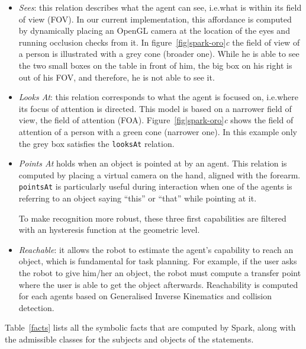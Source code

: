 \documentclass[preprint,3p,times]{elsarticle}
\newcommand{\concept}[1]{{\small \texttt{#1}}}
\newcommand{\ie}{{i.e.\xspace}}
\begin{document}
\begin{itemize}

\item \emph{Sees}: this relation describes what the agent can see, \ie what is
    within its field of view (FOV). In our current implementation, this
    affordance is computed by dynamically placing an OpenGL camera at the
    location of the eyes and running occlusion checks from it.  In
    figure~\ref{fig|spark-oro}\emph{c} the field of view of a person is
    illustrated with a grey cone (broader one). While he is able to see the two
    small boxes on the table in front of him, the big box on his right is out of
    his FOV, and therefore, he is not able to see it. 

\item \emph{Looks At}: this relation corresponds to what the agent is focused
    on, \ie where its focus of attention is directed. This model is based on a
    narrower field of view, the field of attention (FOA).
    Figure~\ref{fig|spark-oro}\emph{c} shows the field of attention
    of a person with a green cone (narrower one). In this example only the grey
    box satisfies the \concept{looksAt} relation.

\item \emph{Points At} holds when an object is pointed at by an agent.
    This relation is computed by placing a virtual camera on the hand, aligned
    with the forearm. \concept{pointsAt} is particularly useful during
    interaction when one of the agents is referring to an object saying ``this''
    or ``that'' while pointing at it.

To make recognition more robust, these three first capabilities are filtered
with an hysteresis function at the geometric level.

\item \emph{Reachable}: it allows the robot to estimate the agent's capability
    to reach an object, which is fundamental for task planning. For example, if
    the user asks the robot to give him/her an object, the robot must compute a
    transfer point where the user is able to get the object afterwards.
    Reachability is computed for each agents based on Generalised Inverse
    Kinematics and collision detection.

\end{itemize}

Table~\ref{facts} lists all the symbolic facts that are computed by {\sc Spark},
along with the admissible classes for the subjects and objects of the statements.
\end{document}

